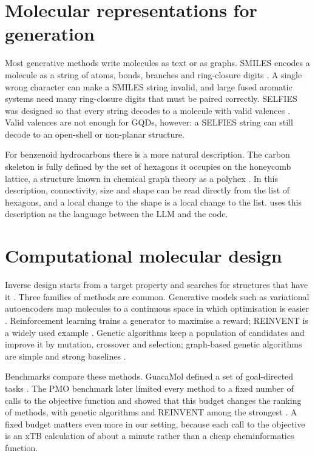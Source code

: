 \section{Molecular representations for generation}
\label{sec:lit-repr}

Most generative methods write molecules as text or as graphs. SMILES encodes a molecule as a
string of atoms, bonds, branches and ring-closure digits \cite{weininger1988smiles}. A single wrong
character can make a SMILES string invalid, and large fused aromatic systems need many ring-closure
digits that must be paired correctly. SELFIES was designed so that every string decodes to a
molecule with valid valences \cite{krenn2020selfies}. Valid valences are not enough for GQDs,
however: a SELFIES string can still decode to an open-shell or non-planar structure.

For benzenoid hydrocarbons there is a more natural description. The carbon skeleton is fully
defined by the set of hexagons it occupies on the honeycomb lattice, a structure known in chemical
graph theory as a polyhex \cite{cyvin1988kekule}. In this description, connectivity, size and
shape can be read directly from the list of hexagons, and a local change to the shape is a local
change to the list.  uses this description as the language between the LLM and the
code.

\section{Computational molecular design}
\label{sec:lit-design}

Inverse design starts from a target property and searches for structures that have it
\cite{sanchezlengeling2018inverse}. Three families of methods are common. Generative models such as
variational autoencoders map molecules to a continuous space in which optimisation is easier
\cite{gomezbombarelli2018vae}. Reinforcement learning trains a generator to maximise a reward;
REINVENT is a widely used example \cite{olivecrona2017reinvent}. Genetic algorithms keep a
population of candidates and improve it by mutation, crossover and selection; graph-based genetic
algorithms are simple and strong baselines \cite{jensen2019graphga,nigam2020gad}.

Benchmarks compare these methods. GuacaMol defined a set of goal-directed tasks
\cite{brown2019guacamol}. The PMO benchmark later limited every method to a fixed number of
calls to the objective function and showed that this budget changes the ranking of methods, with
genetic algorithms and REINVENT among the strongest \cite{gao2022pmo}. A fixed budget matters even
more in our setting, because each call to the objective is an xTB calculation of about a minute
rather than a cheap cheminformatics function.

